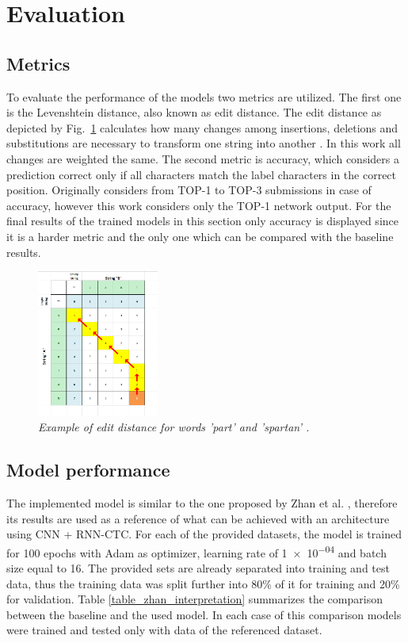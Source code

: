 \section{Evaluation}\label{sec:evaluation}

\subsection{Metrics}

To evaluate the performance of the models two metrics are utilized. The first one is the Levenshtein distance, also known as edit distance. The edit distance as depicted by Fig.~\ref{fig_edit_distance} calculates how many changes among insertions, deletions and substitutions are necessary to transform one string into another \cite{rice_edit_dist}. In this work all changes are weighted the same. The second metric is accuracy, which considers a prediction correct only if all characters match the label characters in the correct position. Originally \cite{icfhr_competition} considers from TOP-1 to TOP-3 submissions in case of accuracy, however this work considers only the TOP-1 network output. For the final results of the trained models in this section only accuracy is displayed since it is a harder metric and the only one which can be compared with the baseline results. 

\begin{figure}[t]
\centerline{\includegraphics[width=40mm]{images/edit_distance}}
\caption{{\it Example of edit distance for words 'part' and 'spartan' \cite{rice_edit_dist}.}}  
\label{fig_edit_distance}
\end{figure}

\subsection{Model performance}

The implemented model is similar to the one proposed by Zhan et al. \cite{zhan2017}, therefore its results are used as a reference of what can be achieved with an architecture using CNN + RNN-CTC. For each of the provided datasets, the model is trained for 100 epochs with Adam as optimizer, learning rate of \num{1e-04} and batch size equal to 16. The provided sets are already separated into training and test data, thus the training data was split further into 80\% of it for training and 20\% for validation. Table \ref{table_zhan_interpretation} summarizes the comparison between the baseline and the used model. In each case of this comparison models were trained and tested only with data of the referenced dataset. 

